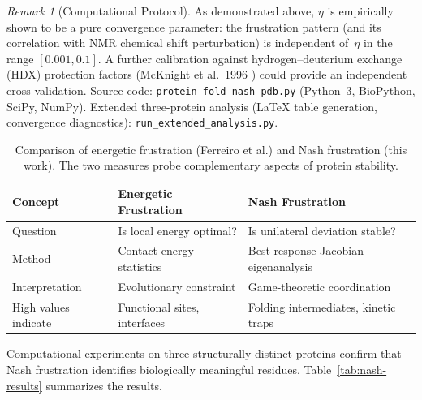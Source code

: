 \documentclass[12pt,a4paper]{article}
\theoremstyle{remark}
\newtheorem{remark}{Remark}
\begin{document}
\begin{remark}[Computational Protocol]
As demonstrated above, $\eta$ is empirically shown to be a pure convergence parameter: the frustration pattern (and its correlation with NMR chemical shift perturbation) is independent of~$\eta$ in the range $[0.001, 0.1]$. A further calibration against hydrogen--deuterium exchange (HDX) protection factors (McKnight et al.\ 1996 \cite{McKnight1996}) could provide an independent cross-validation.
Source code: \texttt{protein\_fold\_nash\_pdb.py} (Python~3, BioPython, SciPy, NumPy).
Extended three-protein analysis (LaTeX table generation, convergence diagnostics): \texttt{run\_extended\_analysis.py}.
\end{remark}

\begin{table}[htbp]
\centering
\caption{Comparison of energetic frustration (Ferreiro et al.) and Nash frustration (this work). The two measures probe complementary aspects of protein stability.}
\label{tab:frustration-comparison}
\begin{tabular}{lll}
\toprule
\textbf{Concept} & \textbf{Energetic Frustration} & \textbf{Nash Frustration} \\
\midrule
Question & Is local energy optimal? & Is unilateral deviation stable? \\
Method & Contact energy statistics & Best-response Jacobian eigenanalysis \\
Interpretation & Evolutionary constraint & Game-theoretic coordination \\
High values indicate & Functional sites, interfaces & Folding intermediates, kinetic traps \\
\bottomrule
\end{tabular}
\end{table}

Computational experiments on three structurally distinct proteins confirm that Nash frustration identifies biologically meaningful residues. Table~\ref{tab:nash-results} summarizes the results.
\end{document}
